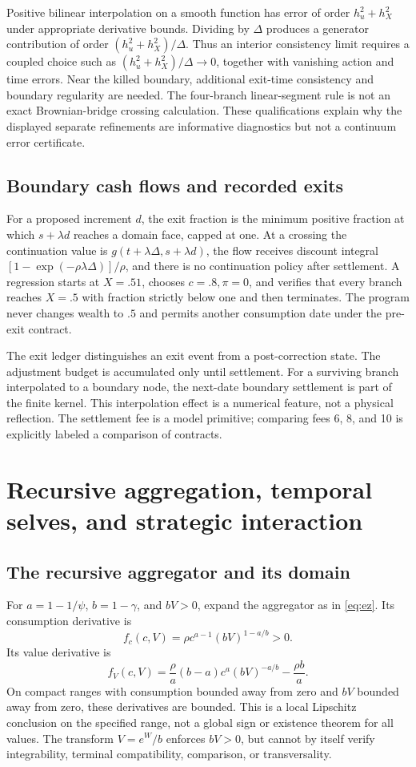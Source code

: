 Positive bilinear interpolation on a smooth function has error of order $h_u^2+h_X^2$ under appropriate derivative bounds. Dividing by $\Delta$ produces a generator contribution of order $(h_u^2+h_X^2)/\Delta$. Thus an interior consistency limit requires a coupled choice such as $(h_u^2+h_X^2)/\Delta\to0$, together with vanishing action and time errors. Near the killed boundary, additional exit-time consistency and boundary regularity are needed. The four-branch linear-segment rule is not an exact Brownian-bridge crossing calculation. These qualifications explain why the displayed separate refinements are informative diagnostics but not a continuum error certificate.

\subsection{Boundary cash flows and recorded exits}
For a proposed increment $d$, the exit fraction is the minimum positive fraction at which $s+\lambda d$ reaches a domain face, capped at one. At a crossing the continuation value is $g(t+\lambda\Delta,s+\lambda d)$, the flow receives discount integral
$[1-\exp(-\rho\lambda\Delta)]/\rho$, and there is no continuation policy after settlement. A regression starts at $X=.51$, chooses $c=.8,\pi=0$, and verifies that every branch reaches $X=.5$ with fraction strictly below one and then terminates. The program never changes wealth to $.5$ and permits another consumption date under the pre-exit contract.

The exit ledger distinguishes an exit event from a post-correction state. The adjustment budget is accumulated only until settlement. For a surviving branch interpolated to a boundary node, the next-date boundary settlement is part of the finite kernel. This interpolation effect is a numerical feature, not a physical reflection. The settlement fee is a model primitive; comparing fees 6, 8, and 10 is explicitly labeled a comparison of contracts.

\section{Recursive aggregation, temporal selves, and strategic interaction}
\label{app:recursive}
\subsection{The recursive aggregator and its domain}
For $a=1-1/\psi$, $b=1-\gamma$, and $bV>0$, expand the aggregator as in \eqref{eq:ez}. Its consumption derivative is
\[
f_c(c,V)=\rho c^{a-1}(bV)^{1-a/b}>0.
\]
Its value derivative is
\[
f_V(c,V)=\frac{\rho}{a}(b-a)c^a(bV)^{-a/b}-\frac{\rho b}{a}.
\]
On compact ranges with consumption bounded away from zero and $bV$ bounded away from zero, these derivatives are bounded. This is a local Lipschitz conclusion on the specified range, not a global sign or existence theorem for all values. The transform $V=e^W/b$ enforces $bV>0$, but cannot by itself verify integrability, terminal compatibility, comparison, or transversality.

